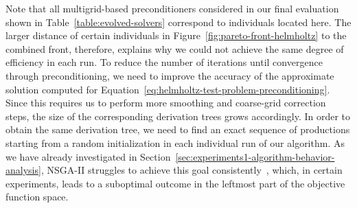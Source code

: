Note that all multigrid-based preconditioners considered in our final evaluation shown in Table~\ref{table:evolved-solvers} correspond to individuals located here.
The larger distance of certain individuals in Figure~\ref{fig:pareto-front-helmholtz} to the combined front, therefore, explains why we could not achieve the same degree of efficiency in each run.
To reduce the number of iterations until convergence through preconditioning, we need to improve the accuracy of the approximate solution computed for Equation~\eqref{eq:helmholtz-test-problem-preconditioning}.
Since this requires us to perform more smoothing and coarse-grid correction steps, the size of the corresponding derivation trees grows accordingly.
In order to obtain the same derivation tree, we need to find an exact sequence of productions starting from a random initialization in each individual run of our algorithm.
As we have already investigated in Section~\ref{sec:experiments1-algorithm-behavior-analysis}, NSGA-II struggles to achieve this goal consistently~\cite{liu2022evolvability}, which, in certain experiments, leads to a suboptimal outcome in the leftmost part of the objective function space.

